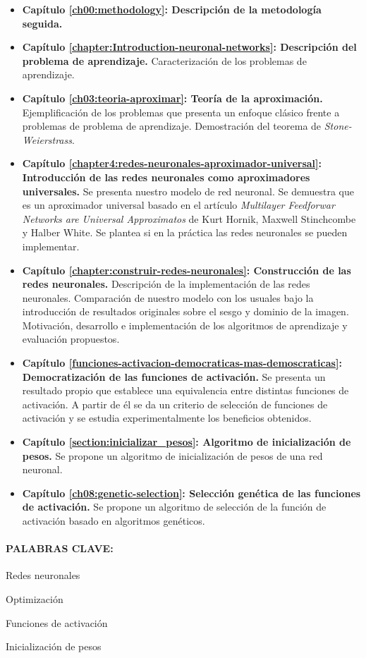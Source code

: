 \begin{itemize}
    \item \textbf{Capítulo \ref{ch00:methodology}: Descripción de la metodología seguida.} 
    \item \textbf{Capítulo \ref{chapter:Introduction-neuronal-networks}: Descripción del problema de aprendizaje.} Caracterización de los problemas de aprendizaje.
    \item \textbf{Capítulo \ref{ch03:teoria-aproximar}: Teoría de la aproximación.} Ejemplificación de los problemas que presenta un enfoque clásico frente a problemas de problema de aprendizaje.  Demostración del teorema de \textit{Stone-Weierstrass}.
    \item \textbf{Capítulo \ref{chapter4:redes-neuronales-aproximador-universal}: Introducción de las redes neuronales como aproximadores universales.} Se presenta nuestro modelo de red neuronal. Se demuestra que es un aproximador universal basado en el artículo 
    \textit{Multilayer Feedforwar Networks are Universal Approximatos} de Kurt Hornik, 
    Maxwell Stinchcombe y Halber White. Se plantea si en la práctica las redes neuronales se pueden implementar.
    \item \textbf{Capítulo \ref{chapter:construir-redes-neuronales}: Construcción de las redes neuronales.} Descripción de la implementación de las redes neuronales. 
    Comparación de nuestro modelo con los usuales bajo la introducción de resultados originales sobre el sesgo y dominio de la imagen. Motivación, desarrollo e implementación de los algoritmos de aprendizaje y evaluación propuestos.
    \item \textbf{Capítulo \ref{funciones-activacion-democraticas-mas-demoscraticas}: Democratización de las funciones de activación.} Se presenta un resultado propio que establece una equivalencia entre distintas funciones de activación. A partir de él se da un criterio de selección de funciones de activación y se estudia experimentalmente los beneficios obtenidos. 
    \item \textbf{Capítulo \ref{section:inicializar_pesos}: Algoritmo de inicialización de pesos.} Se propone un algoritmo de inicialización de pesos de una red neuronal.
    \item \textbf{Capítulo \ref{ch08:genetic-selection}: Selección genética de las funciones de activación.} Se propone un algoritmo de selección de la función de activación basado en algoritmos genéticos. 
\end{itemize}

\paragraph{PALABRAS CLAVE:}
\begin{itemize*}[label=,itemsep=1em,itemjoin=\hspace{1em}]
  \item Redes neuronales
  \item Optimización 
  \item Funciones de activación 
  \item Inicialización de pesos
\end{itemize*}

\endinput
